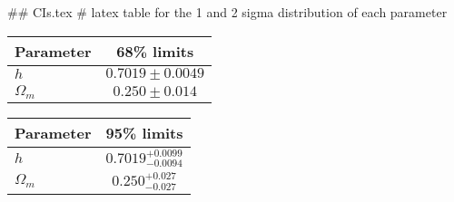 ## CIs.tex
# latex table for the 1 and 2 sigma distribution of each parameter

\begin{tabular} { l  c}
 Parameter &  68\% limits\\
\hline
{\boldmath$h              $} & $0.7019\pm 0.0049          $\\
{\boldmath$\Omega_m       $} & $0.250\pm 0.014            $\\
\hline
\end{tabular}

\begin{tabular} { l  c}
 Parameter &  95\% limits\\
\hline
{\boldmath$h              $} & $0.7019^{+0.0099}_{-0.0094}$\\
{\boldmath$\Omega_m       $} & $0.250^{+0.027}_{-0.027}   $\\
\hline
\end{tabular}
